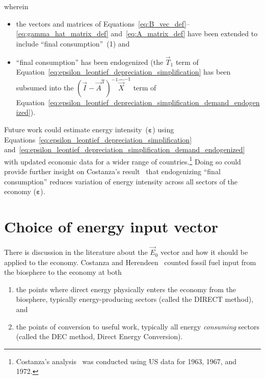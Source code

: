 \noindent{}wherein 

\begin{itemize}
	\item{the vectors and matrices of Equations~\ref{eq:B_vec_def}--\ref{eq:gamma_hat_matrix_def}
	and~\ref{eq:A_matrix_def} have been extended to include ``final consumption''~(1) and}
	\item{ ``final consumption'' has been endogenized
	(the $\vec{T}_{1}$ term of Equation~\ref{eq:epsilon_leontief_depreciation_simplification}
	has been subsumed into the 
	${(\vec{I} - \vec{A}^{\mathrm{T}})}^{-1}\hat{\vec{X}}^{-1}$
	term of Equation~\ref{eq:epsilon_leontief_depreciation_simplification_demand_endogenized}).}
\end{itemize}

Future work could estimate energy intensity~($\boldsymbol{\varepsilon}$) 
using Equations~\ref{eq:epsilon_leontief_depreciation_simplification}
and~\ref{eq:epsilon_leontief_depreciation_simplification_demand_endogenized}
with updated economic data for a wider range of countries.\footnote{Costanza's
analysis~\cite{Costanza:1980ww} was conducted using US data for 1963, 1967, and 1972.}
Doing so could provide further insight on Costanza's result~\cite{Costanza:1980ww}
that endogenizing ``final consumption'' reduces variation 
of energy intensity across all sectors of the economy ($\boldsymbol{\varepsilon}$).


\section{Choice of energy input vector}
\label{sec:energy_input_vector}


There is discussion in the literature about the $\vec{E}_{0}$
vector and how it should be applied to the economy.
Costanza and Herendeen~\cite{Costanza:1984tq} counted fossil fuel input 
from the biosphere to the economy
at both 

\begin{enumerate}
	\item the points where direct energy physically 
		enters the economy from the biosphere, 
		typically energy-producing sectors
		(called the DIRECT method), and
	\item the points of conversion to useful work, 
		typically all energy \emph{consuming} sectors
		(called the DEC method, 
		Direct Energy Conversion).
\end{enumerate}

